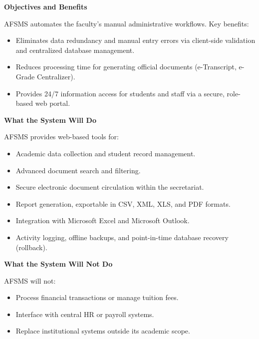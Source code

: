 \documentclass[11pt, a4paper]{article}
\begin{document}
\textbf{Objectives and Benefits}

AFSMS automates the faculty's manual administrative workflows. Key benefits:
\begin{itemize}
    \item Eliminates data redundancy and manual entry errors via client-side validation and centralized database management.
    \item Reduces processing time for generating official documents (e-Transcript, e-Grade Centralizer).
    \item Provides 24/7 information access for students and staff via a secure, role-based web portal.
\end{itemize}

\textbf{What the System Will Do}

AFSMS provides web-based tools for:
\begin{itemize}
    \item Academic data collection and student record management.
    \item Advanced document search and filtering.
    \item Secure electronic document circulation within the secretariat.
    \item Report generation, exportable in CSV, XML, XLS, and PDF formats.
    \item Integration with Microsoft Excel and Microsoft Outlook.
    \item Activity logging, offline backups, and point-in-time database recovery (rollback).
\end{itemize}

\textbf{What the System Will Not Do}

AFSMS will not:
\begin{itemize}
    \item Process financial transactions or manage tuition fees.
    \item Interface with central HR or payroll systems.
    \item Replace institutional systems outside its academic scope.
\end{itemize}
\end{document}
